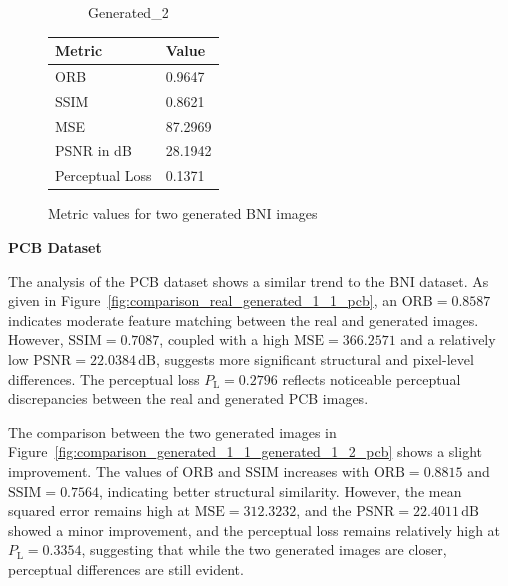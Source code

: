 \documentclass[12pt,DIV14,BCOR12mm,a4paper,footinclude=false,headinclude,parskip=half-,twoside,openright,cleardoublepage=empty,toc=index,bibliography=totoc,listof=totoc]{scrreprt}
\numberwithin{equation}{chapter}
\begin{document}
\begin{figure}
\begin{minipage}[H]{\linewidth}
\begin{minipage}[H]{0.5\linewidth}
\begin{subfigure}[t]{0.48\linewidth}
                \caption{Generated\_2}
            \end{subfigure}
        \end{minipage}%
        \hfill
        \begin{minipage}[H]{0.5\linewidth} %
            \centering
            \small
            \begin{tabular}{p{3cm} p{2cm}}
                \toprule
                \textbf{Metric} & \textbf{Value} \\
                \midrule
                ORB             & 0.9647        \\
                SSIM            & 0.8621        \\
                MSE             & 87.2969       \\
                PSNR in dB      & 28.1942       \\
                Perceptual Loss & 0.1371        \\
                \bottomrule
            \end{tabular}
        \end{minipage}%
        \caption{Metric values for two generated BNI images}
        \label{fig:comparison_generated_1_1_generated_1_2_bni}
    \end{minipage}
\end{figure}


\textbf{PCB Dataset}

The analysis of the PCB dataset shows a similar trend to the BNI dataset. As given in Figure~\ref{fig:comparison_real_generated_1_1_pcb}, an $\text{ORB} = 0.8587$ indicates moderate feature matching between the real and generated images. However, $\text{SSIM} = 0.7087$, coupled with a high $\text{MSE} = 366.2571$ and a relatively low $\text{PSNR} = 22.0384\, \mathrm{dB}$, suggests more significant structural and pixel-level differences. The perceptual loss $P_{\text{L}} = 0.2796$ reflects noticeable perceptual discrepancies between the real and generated PCB images.

The comparison between the two generated images in Figure~\ref{fig:comparison_generated_1_1_generated_1_2_pcb} shows a slight improvement. The values of $\text{ORB}$ and $\text{SSIM}$ increases with $\text{ORB} = 0.8815$ and $\text{SSIM} = 0.7564$, indicating better structural similarity. However, the mean squared error remains high at $\text{MSE} = 312.3232$, and the $\text{PSNR} = 22.4011\, \mathrm{dB}$ showed a minor improvement, and the perceptual loss remains relatively high at $P_{\text{L}} = 0.3354$, suggesting that while the two generated images are closer, perceptual differences are still evident.
\end{document}
